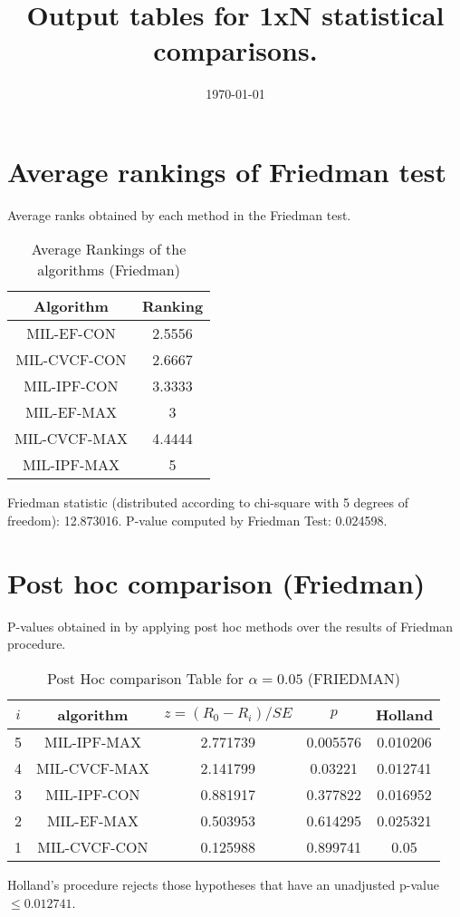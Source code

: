 \documentclass[a4paper,10pt]{article}
\title{Output tables for 1xN statistical comparisons.}
\author{}
\date{\today}
\begin{document}
\begin{landscape}
\pagestyle{empty}
\maketitle
\thispagestyle{empty}

\section{Average rankings of Friedman test}


Average ranks obtained by each method in the Friedman test.

\begin{table}[!htp]
\centering
\begin{tabular}{|c|c|}\hline
Algorithm&Ranking\\\hline
MIL-EF-CON&2.5556\\MIL-CVCF-CON&2.6667\\MIL-IPF-CON&3.3333\\MIL-EF-MAX&3\\MIL-CVCF-MAX&4.4444\\MIL-IPF-MAX&5\\\hline\end{tabular}
\caption{Average Rankings of the algorithms (Friedman)}
\end{table}

Friedman statistic (distributed according to chi-square with 5 degrees of freedom): 12.873016. \newline P-value computed by Friedman Test: 0.024598.\newline


\newpage

\section{Post hoc comparison (Friedman)}


P-values obtained in by applying post hoc methods over the results of Friedman procedure.

\begin{table}[!htp]
\centering\footnotesize
\begin{tabular}{ccccc}
$i$&algorithm&$z=(R_0 - R_i)/SE$&$p$&Holland\\
\hline5&MIL-IPF-MAX&2.771739&0.005576&0.010206\\4&MIL-CVCF-MAX&2.141799&0.03221&0.012741\\3&MIL-IPF-CON&0.881917&0.377822&0.016952\\2&MIL-EF-MAX&0.503953&0.614295&0.025321\\1&MIL-CVCF-CON&0.125988&0.899741&0.05\\\hline
\end{tabular}
\caption{Post Hoc comparison Table for $\alpha=0.05$ (FRIEDMAN)}
\end{table}Holland's procedure rejects those hypotheses that have an unadjusted p-value $\le0.012741$.



\end{landscape}
\end{document}
